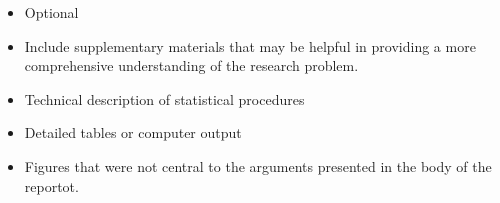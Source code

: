 \documentclass[]{article}
\def\tightlist{}
\begin{document}
\begin{itemize}
\tightlist
\item
  Optional
\item
  Include supplementary materials that may be helpful in providing a more comprehensive understanding of the research problem.
\item
  Technical description of statistical procedures
\item
  Detailed tables or computer output
\item
  Figures that were not central to the arguments presented in the body of the reportot.
\end{itemize}


\end{document}
